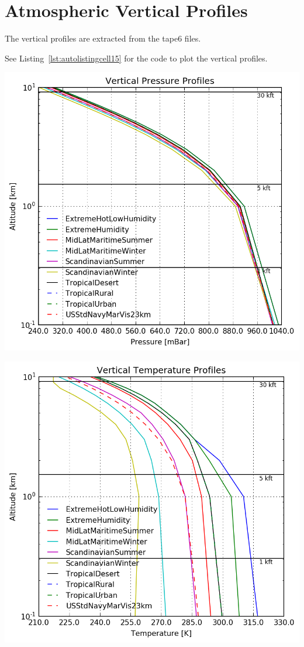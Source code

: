 \documentclass{workpackage}
\begin{document}
\section{Atmospheric Vertical Profiles}
\label{sec:AtmosphericVerticalProfiles}

The vertical profiles are extracted from the tape6 files.




See Listing~\ref{lst:autolistingcell15} for the code to plot the vertical profiles.

\begin{center}
\includegraphics{./pic/Analyse-Standard-Atmospheres_15_0.png}
\end{center}

\begin{center}
\includegraphics{./pic/Analyse-Standard-Atmospheres_15_1.png}
\end{center}
\end{document}
